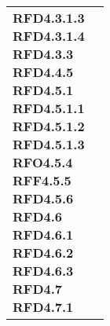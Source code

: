 \begin{longtable}[H]{| >{\centering\bfseries}p{8cm} | >{\centering\arraybackslash}p{8cm} |}
{    RFD4.3.1.3                                                                                                   \\
    RFD4.3.1.4                                                                                                   \\
    RFD4.3.3                                                                                                     \\
    RFD4.4.5                                                                                                     \\
    RFD4.5.1                                                                                                     \\
    RFD4.5.1.1                                                                                                   \\
    RFD4.5.1.2                                                                                                   \\
    RFD4.5.1.3                                                                                                   \\
    RFO4.5.4                                                                                                     \\
    RFF4.5.5                                                                                                     \\
    RFD4.5.6                                                                                                     \\
    RFD4.6                                                                                                       \\
    RFD4.6.1                                                                                                     \\
    RFD4.6.2                                                                                                     \\
    RFD4.6.3                                                                                                     \\
    RFD4.7                                                                                                       \\
    RFD4.7.1                                                                                                     \\
}
\end{longtable}
